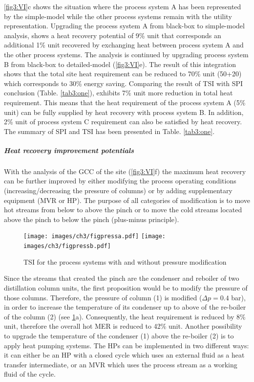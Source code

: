  \cref{fig3:VI}c shows the situation where the process system A has been represented by the simple-model while the other process systems remain with the utility representation. Upgrading the process system A from black-box to simple-model analysis, shows a heat recovery potential of 9\% unit that corresponds an additional 1\% unit recovered by exchanging heat between process system A and the other process systems. The analysis is continued by upgrading process system B from black-box to detailed-model (\cref{fig3:VI}e). The result of this integration shows that the total site heat requirement can be reduced to 70\% unit (50+20) which corresponds to 30\% energy saving. Comparing the result of TSI with SPI conclusion (Table. \ref{tab3:one}), exhibits 7\% unit more reduction in total heat requirement. This means that the heat requirement of the process system A (5\% unit) can be fully supplied by heat recovery with process system B. In addition, 2\% unit of process system C requirement can also be satisfied by heat recovery. The summary of SPI and TSI has been presented in Table. \ref{tab3:one}. 
 
 \subparagraph{Heat recovery improvement potentials}

With the analysis of the GCC of the site (\cref{fig3:VI}f) the maximum heat recovery can be further improved by either modifying the process operating conditions (increasing/decreasing the pressure of columns) or by adding supplementary equipment (MVR or HP). The purpose of all categories of modification is to move hot streams from  below to above the pinch or to move the cold streams located above the pinch to below the pinch (plus-minus principle). 

\begin{figure}[!ht]
\centering
\texttt{[image: images/ch3/figpressa.pdf]}
\texttt{[image: images/ch3/figpressb.pdf]}
\caption{TSI for the process systems with and without pressure modification}
\label{fig3:VII}
\end{figure}

 Since the  streams that created the pinch are the condenser and reboiler of two distillation column units, the first proposition would be to modify the pressure of those columns. Therefore, the pressure of column (1) is modified ($\Delta p=0.4$ bar), in order to increase the temperature of its condenser up to above of the re-boiler of the column (2) (see \cref{fig3:VII}a). Consequently, the heat requirement is reduced by 8\% unit, therefore the overall hot MER is reduced to 42\% unit. Another possibility to upgrade the temperature of the condenser (1) above the re-boiler (2) is to apply heat pumping systems. The HPs can be implemented in two different ways: it can either be an HP with a closed cycle which uses an external fluid as a heat transfer intermediate, or an MVR which uses the process stream as a working fluid of the cycle. 
 
